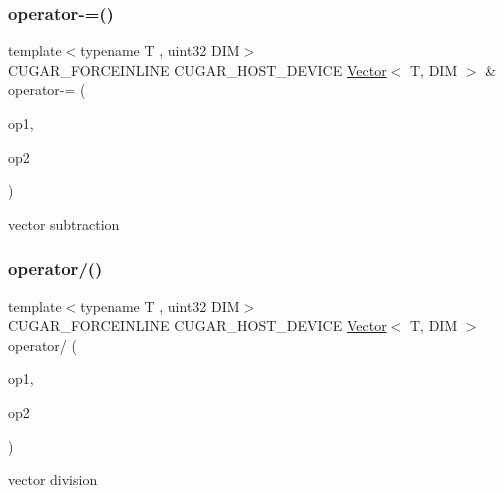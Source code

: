 \subsubsection{\texorpdfstring{operator-\/=()}{operator-=()}}
{\footnotesize\ttfamily template$<$typename T , uint32 D\+IM$>$ \\
C\+U\+G\+A\+R\+\_\+\+F\+O\+R\+C\+E\+I\+N\+L\+I\+NE C\+U\+G\+A\+R\+\_\+\+H\+O\+S\+T\+\_\+\+D\+E\+V\+I\+CE \hyperlink{structcugar_1_1_vector}{Vector}$<$ T, D\+IM $>$ \& operator-\/= (\begin{DoxyParamCaption}\item[{\hyperlink{structcugar_1_1_vector}{Vector}$<$ T, D\+IM $>$ \&}]{op1,  }\item[{const \hyperlink{structcugar_1_1_vector}{Vector}$<$ T, D\+IM $>$ \&}]{op2 }\end{DoxyParamCaption})\hspace{0.3cm}{\ttfamily [related]}}

vector subtraction \mbox{\label{group___vectors_module_gae077be2185ca7f28e1fae4fc110a14bf}} 
\subsubsection{\texorpdfstring{operator/()}{operator/()}\hspace{0.1cm}{\footnotesize\ttfamily [1/2]}}
{\footnotesize\ttfamily template$<$typename T , uint32 D\+IM$>$ \\
C\+U\+G\+A\+R\+\_\+\+F\+O\+R\+C\+E\+I\+N\+L\+I\+NE C\+U\+G\+A\+R\+\_\+\+H\+O\+S\+T\+\_\+\+D\+E\+V\+I\+CE \hyperlink{structcugar_1_1_vector}{Vector}$<$ T, D\+IM $>$ operator/ (\begin{DoxyParamCaption}\item[{const \hyperlink{structcugar_1_1_vector}{Vector}$<$ T, D\+IM $>$ \&}]{op1,  }\item[{const \hyperlink{structcugar_1_1_vector}{Vector}$<$ T, D\+IM $>$ \&}]{op2 }\end{DoxyParamCaption})\hspace{0.3cm}{\ttfamily [related]}}

vector division \mbox{\label{group___vectors_module_ga70b345927dd31af9708e03dbc2ebac67}} 
